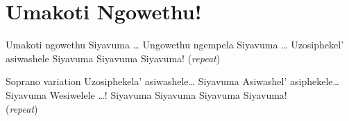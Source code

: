 \starttocol
\chapter{Umakoti Ngowethu!}
\nexttocol
\hfill{\it }
\stoptocol
\starttocol
\startlines
{\sc Umakoti} ngowethu 
Siyavuma  \dots
Ungowethu ngempela
Siyavuma  \dots
Uzosiphekel' asiwashele
Siyavuma
Siyavuma
Siyavuma!
          \hfill({\it repeat})~~~~~~~~~

Soprano variation
Uzosiphekela' asiwashele\dots
Siyavuma
Asiwashel' asiphekele\dots
Siyavuma
Wesiwelele \dots!
Siyavuma
Siyavuma
Siyavuma
Siyavuma!
          \hfill({\it repeat})~~~~~~~~~
\stoplines
\nexttocol

\stoptocol
